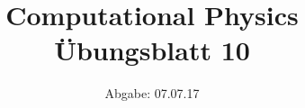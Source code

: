 ﻿


 \title{Computational Physics Übungsblatt 10}
\date{
  Abgabe: 07.07.17
}



 \setlength{\parindent}{0pt}
\maketitle
\thispagestyle{empty}
\newpage



%
%




